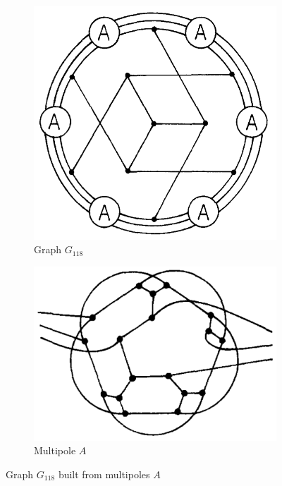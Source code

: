 \documentclass[12pt, twoside]{book}
\begin{document}
\begin{example}
	\begin{figure}
		\centering
		\begin{subfigure}[b]{0.4\textwidth}
			\centering
			\includegraphics[width=\textwidth]{images/Kochol-article/Kochol-final-graph}
			\caption{Graph $G_{118}$}
			\label{fig:Kochol-final-graph-G118}
		\end{subfigure}
		\hfill
		\begin{subfigure}[b]{0.45\textwidth}
			\centering
			\includegraphics[width=\textwidth]{images/Kochol-article/Kochol-multipole-A}
			\caption{Multipole $A$}
			\label{fig:Kochol-multipole-A}
		\end{subfigure}
		\caption{\cite{Kochol1996} Graph $G_{118}$ built from multipoles $A$}
	\end{figure}


\end{example}
\end{document}
